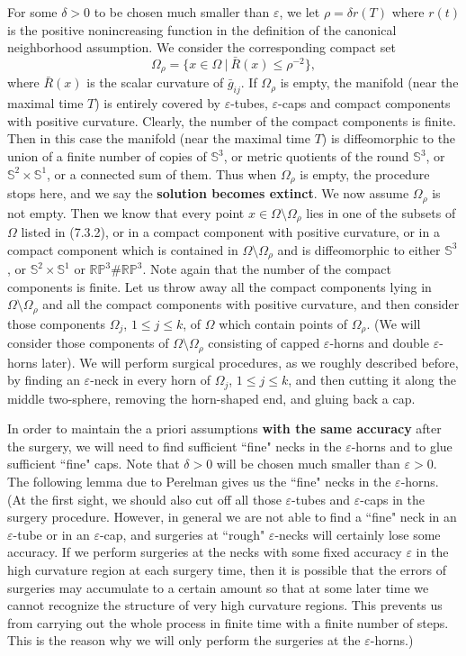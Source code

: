 For some $\delta>0$ to be chosen much smaller than $\varepsilon$,
we let $\rho=\delta r(T)$ where $r(t)$ is the positive
nonincreasing function in the definition of the canonical
neighborhood assumption. We consider the corresponding compact set
$$
\Omega_\rho=\{x\in\Omega\ |\ \bar{R}(x)\leq\rho^{-2}\},
$$
where $\bar{R}(x)$ is the scalar curvature of $\bar{g}_{ij}$. If
$\Omega_\rho$ is empty, the manifold (near the maximal time $T$)
is entirely covered by $\varepsilon$-tubes, $\varepsilon$-caps and
compact components with positive curvature. Clearly, the number of
the compact components is finite. Then in this case the manifold
(near the maximal time $T$) is diffeomorphic to the union of a
finite number of copies of $\mathbb{S}^3$, or metric quotients of
the round $\mathbb{S}^3$, or $\mathbb{S}^2 \times \mathbb{S}^1$,
or a connected sum of them. Thus when $\Omega_\rho$ is empty, the
procedure stops here, and we say the \textbf{solution becomes
extinct}. We now assume
$\Omega_\rho$ is not empty. Then we know that every point
$x\in\Omega\setminus\Omega_\rho$ lies in one of the subsets of
$\Omega$ listed in (7.3.2), or in a compact component with
positive curvature, or in a compact component which is contained
in $\Omega\setminus\Omega_\rho$ and is diffeomorphic to either
$\mathbb{S}^3$, or $\mathbb{S}^2 \times \mathbb{S}^1$ or
$\mathbb{RP}^3\#\mathbb{RP}^3$. Note again that the number of the
compact components is finite. Let us throw away all the compact
components lying in $\Omega\setminus\Omega_\rho$ and all the
compact components with positive curvature, and then consider
those components $\Omega_j$, $1\leq j\leq k$, of $\Omega$ which
contain points of $\Omega_\rho$. (We will consider those
components of $\Omega\setminus\Omega_\rho$ consisting of capped
$\varepsilon$-horns and double $\varepsilon$-horns later). We will
perform surgical procedures, as we roughly described before, by
finding an $\varepsilon$-neck in every horn of $\Omega_j$, $1\leq
j\leq k$, and then cutting it along the middle two-sphere,
removing the horn-shaped end, and gluing back a cap.

In order to maintain the a priori assumptions \textbf{with the
same accuracy} after the surgery, we will need to find sufficient
``fine" necks in the $\varepsilon$-horns and to glue sufficient
``fine" caps. Note that $\delta>0$ will be chosen much smaller
than $\varepsilon>0$. The following lemma due to Perelman
\cite{P2} gives us the ``fine" necks in the $\varepsilon$-horns.
(At the first sight, we should also cut off all those
$\varepsilon$-tubes and $\varepsilon$-caps in the surgery
procedure. However, in general we are not able to find a ``fine"
neck in an $\varepsilon$-tube or in an $\varepsilon$-cap, and
surgeries at ``rough" $\varepsilon$-necks will certainly lose some
accuracy. If we perform surgeries at the necks with some fixed
accuracy $\varepsilon$ in the high curvature region at each
surgery time, then it is possible that the errors of surgeries may
accumulate to a certain amount so that at some later time we
cannot recognize the structure of very high curvature regions.
This prevents us from carrying out the whole process in finite
time with a finite number of steps. This is the reason why we will
only perform the surgeries at the $\varepsilon$-horns.)

